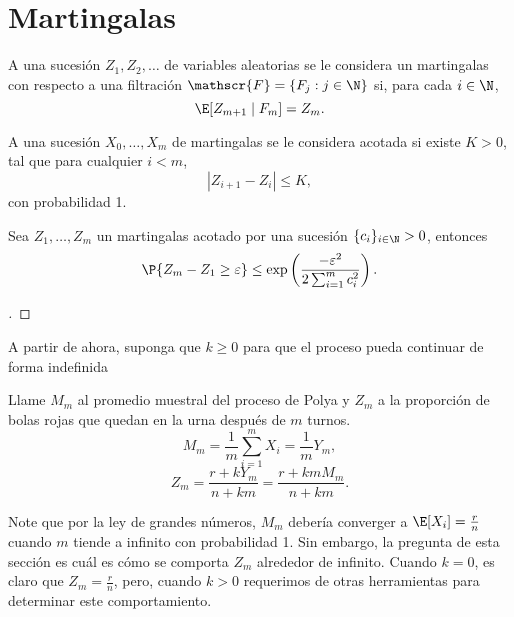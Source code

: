 \section{Martingalas}

\begin{definition}
    A una sucesión $Z_1,Z_2,\ldots$ de variables aleatorias se le considera un martingalas con respecto a una filtración $\mathscr{F} = \{F_j : j \in \N\}$ si, para cada $i\in\N$,
    \[ \E [Z_{m+1} \;|\; F_m] = Z_m. \]
\end{definition}

\begin{definition}
    A una sucesión $X_0,\ldots, X_m$ de martingalas se le considera acotada si existe $K > 0$, tal que para cualquier $i < m$,
    \[ |Z_{i+1} - Z_i| \leq K, \]
    con probabilidad 1.
\end{definition}

\begin{theorem} Sea $Z_1,\ldots, Z_m$ un martingalas acotado por una sucesión $\{c_i\}_{i\in\N}>0$, entonces
    \[ \P\{Z_m - Z_1 \geq \varepsilon\} \leq \exp\left( \frac{-\varepsilon^2}{2\sum_{i = 1}^m c_i^2} \right). \]    
\end{theorem}

\begin{proof}[]
    \vspace*{-2em}
\end{proof}

A partir de ahora, suponga que $k \geq 0$ para que el proceso pueda continuar de forma indefinida

\begin{definition} Llame $M_m$ al promedio muestral del proceso de Polya y $Z_m$ a la proporción de bolas rojas que quedan en la urna después de $m$ turnos.
    \[ M_m = \frac{1}{m} \sum_{i = 1}^m  X_i = \frac{1}{m} Y_m,\]
    \[ Z_m = \frac{r+kY_m}{n+km} = \frac{r+ km M_m}{n+km}. \]
\end{definition}

Note que por la ley de grandes números, $M_m$ debería converger a $\E[X_i] = \frac{r}{n}$ cuando $m$ tiende a infinito con probabilidad 1. Sin embargo, la pregunta de esta sección es cuál es cómo se comporta $Z_m$ alrededor de infinito. Cuando $k = 0$, es claro que $Z_m = \frac{r}{n}$, pero, cuando $k > 0$ requerimos de otras herramientas para determinar este comportamiento.

